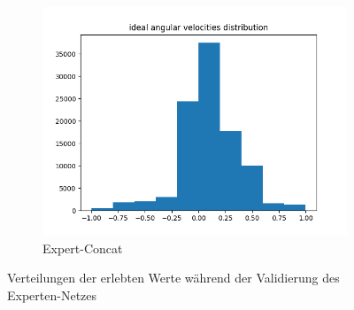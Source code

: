 \begin{figure}[H]
\begin{subfigure}[h]{0.4\textwidth}
		\centering
		\includegraphics[width=\linewidth]{kapitel5/images/eval/expert/expert-concat-distr.png}
		\caption{\glqq Expert-Concat\grqq}
		\label{expert-concat-val-distr}
	\end{subfigure}
	\caption{Verteilungen der erlebten Werte während der Validierung des Experten-Netzes}
	\label{expert-val-distr}
\end{figure}

